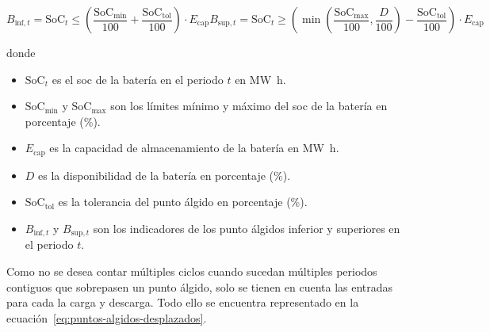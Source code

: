   \begin{samepage}

    \begin{subequations}
      \label{eq:puntos-algidos-inf-sup}

      \begin{equation}
        B_{\text{inf}, t} = \mathrm{SoC}_{t} \le \left( \frac{\mathrm{SoC}_{\text{min}}}{100} + \frac{\mathrm{SoC}_{\text{tol}}}{100} \right) \cdot E_{\text{cap}}
      \end{equation}

      \begin{equation}
        B_{\text{sup}, t} = \mathrm{SoC}_{t} \ge \left( \min\left(\frac{\mathrm{SoC}_{\text{max}}}{100}, \frac{D}{100}\right) - \frac{\mathrm{SoC}_{\text{tol}}}{100} \right) \cdot E_{\text{cap}}
      \end{equation}

    \end{subequations}

    donde

    \begin{itemize}

      \item \( \mathrm{SoC}_{t} \) es el \gls{soc} de la batería en el periodo \( t \) en \si{{\mega\watt\hour}}.

      \item \( \mathrm{SoC}_{\text{min}} \) y \( \mathrm{SoC}_{\text{max}} \) son los límites mínimo y máximo del \gls{soc} de la batería en porcentaje (\%).

      \item \( E_{\text{cap}} \) es la capacidad de almacenamiento de la batería en \si{{\mega\watt\hour}}.

      \item \( D \) es la disponibilidad de la batería en porcentaje (\%).

      \item \( \mathrm{SoC}_{\text{tol}} \) es la tolerancia del punto álgido en porcentaje (\%).

      \item \( B_{\text{inf}, t} \) y \( B_{\text{sup}, t} \) son los indicadores de los punto álgidos inferior y superiores en el periodo \( t \).

    \end{itemize}

  \end{samepage}

  Como no se desea contar múltiples ciclos cuando sucedan múltiples periodos contiguos que sobrepasen un punto álgido, solo se tienen en cuenta las entradas para cada la carga y descarga. Todo ello se encuentra representado en la ecuación~\ref{eq:puntos-algidos-desplazados}.

